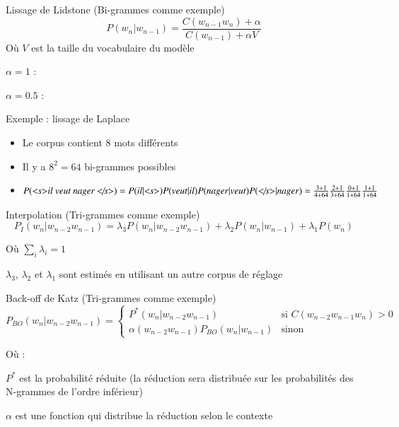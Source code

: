 \documentclass{KodeBook}
\begin{document}
\begin{block}{Lissage de Lidstone (Bi-grammes comme exemple)}
	\[%
	P(w_n | w_{n-1}) = \frac{C(w_{n-1} w_n) + \alpha}{C(w_{n-1}) + \alpha V}
	\]
	Où $V$ est la taille du vocabulaire du modèle
	
	$\alpha = 1$ :  
	
	$\alpha = 0.5$ : 
\end{block}

\begin{exampleblock}{Exemple : lissage de Laplace}
	\begin{itemize}
		\item Le corpus contient 8 mots différents
		\item Il y a  $8^2 = 64$ bi-grammes possibles
		\item $P(\text{\textit{\textless s\textgreater il veut nager \textless/s\textgreater}}) = 
		P(il|\text{\textit{\textless s\textgreater}}) P(veut|il) P(nager|veut)  P(\text{\textit{\textless/s\textgreater}}|nager) = 
		\frac{3 + 1}{4 + 64} \frac{2 + 1}{3 + 64} \frac{0 + 1}{1 + 64} \frac{1 + 1}{1 + 64} $
	\end{itemize}
\end{exampleblock}

\begin{block}{Interpolation (Tri-grammes comme exemple)}
	\[%
	P_{I}(w_n | w_{n-2} w_{n-1}) = 
	\lambda_3 P(w_n | w_{n-2} w_{n-1}) 
	+ \lambda_2 P(w_n | w_{n-1}) 
	+ \lambda_1 P(w_n) 
	\]
	
	Où $\sum_i \lambda_i = 1$
	
	$\lambda_3$, $\lambda_2$ et $\lambda_1$ sont estimés en utilisant un autre corpus de réglage
\end{block}

\begin{block}{Back-off de Katz (Tri-grammes comme exemple)}
	\[%
	P_{BO}(w_n | w_{n-2} w_{n-1}) = 
	\begin{cases}
	P^*(w_n | w_{n-2} w_{n-1}) & \text{si } C(w_{n-2} w_{n-1} w_n) > 0 \\
	\alpha(w_{n-2} w_{n-1}) P_{BO}(w_n | w_{n-1}) & \text{sinon}
	\end{cases}
	\]
	
	Où : 
	
	$P^*$ est la probabilité réduite (la réduction sera distribuée sur les probabilités des N-grammes de l'ordre inférieur)
	
	$\alpha$ est une fonction qui distribue la réduction selon le contexte
\end{block}
\end{document}
